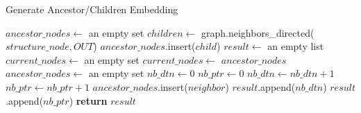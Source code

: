         \begin{algorithm}[H]
            \caption{Generate Ancestor/Children Embedding}
            \label{algo:embedding:generate_ancestor_children_embedding}
            \begin{algorithmic}
                    \State $ancestor\_nodes \gets$ an empty set
                    \State $children \gets$ graph.neighbors\_directed($structure\_node, OUT$) 
                        \State $ancestor\_nodes$.insert($child$)
                    \EndFor
                    \State $result \gets$ an empty list
                    \State $current\_nodes \gets$ an empty set
                        \State $current\_nodes \gets$ $ancestor\_nodes$ 
                        \State $ancestor\_nodes \gets$ an empty set
                        \State $nb\_dtn \gets 0$
                        \State $nb\_ptr \gets 0$
                             
                                \State $nb\_dtn \gets nb\_dtn + 1$
                                \State $nb\_ptr \gets nb\_ptr + 1$
                            \EndIf
                                \State $ancestor\_nodes$.insert($neighbor$) 
                            \EndFor
                        \EndFor
                        \State $result$.append($nb\_dtn$) 
                        \State $result$.append($nb\_ptr$) 
                    \EndFor
                    \State \textbf{return} $result$
                \EndFunction
            \end{algorithmic}
        \end{algorithm}
        
